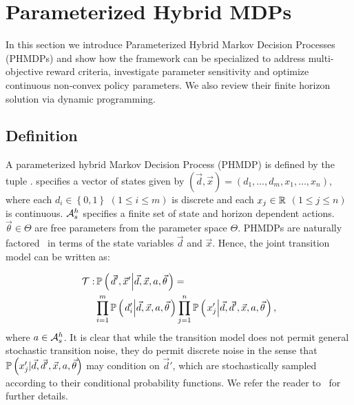 \section{Parameterized Hybrid MDPs}
\label{sec:hybrid_mdps}

In this section we introduce Parameterized Hybrid Markov Decision Processes (PHMDPs) and show how the framework can be specialized to address multi-objective reward criteria, investigate parameter sensitivity and optimize continuous non-convex policy parameters. We also review their finite horizon solution via dynamic programming.

\subsection{Definition}
\label{sec:phmdp_def}

A parameterized hybrid Markov Decision Process (PHMDP) is defined by the tuple {\footnotesize \PMDPTuple}. {\footnotesize \State} specifies a vector of states given by {\footnotesize $(\vec{d}, \vec{x}) =  \left( d_1, \ldots, d_m, x_1, \ldots, x_n \right) $}, where each {\footnotesize $ d_i \in \left\lbrace 0, 1 \right\rbrace $} {\footnotesize $\left( 1 \leq i \leq m \right)$} is discrete and each {\footnotesize$ x_j \in \mathbb{R} $} {\footnotesize $\left( 1 \leq j \leq   n \right)$} is continuous. {\footnotesize $\mathcal{A}^{h}_{s}$} specifies a finite set of state and horizon dependent actions.  {\footnotesize $\vec{\theta} \in \Theta$} are free parameters from the parameter space {\footnotesize $ \Theta $}. PHMDPs are naturally factored~\parencite{Boutilier_JAIR_1999} in terms of the state variables {\footnotesize$\vec{d}$} and {\footnotesize
$\vec{x}$}. Hence, the joint transition model can be written as:

{\footnotesize
\abovedisplayskip=0pt
\belowdisplayskip=0pt
\begin{align}
    \label{eq:hmdp_tfunc}
    \mathcal{T} :& \, \mathbb{P}\left({ \left. \vec{d}', \vec{x}' \middle| \vec{d}, \vec{x}, a, \vec{\theta} \right.}\right) = \nonumber \\
    & \prod_{i=1}^{m} \mathbb{P}\left({ \left. d_i' \middle| \vec{d}, \vec{x}, a, \vec{\theta} \right. }\right) \prod_{j=1}^{n} \mathbb{P}\left({ \left. x_j' \middle| \vec{d}, \vec{d}', \vec{x}, a, \vec{\theta} \right. }\right),
\end{align}   
}
where {\footnotesize $ a \in \mathcal{A}^{h}_{s} $}. It is clear that while the transition model does not permit general stochastic transition noise, they do permit discrete noise in the sense that {\footnotesize $ \mathbb{P}\left({ x_j' | \vec{d}, \vec{d}', \vec{x}, a, \vec{\theta} }\right) $} may condition on $ \vec{d}' $, which are stochastically sampled according to their conditional probability functions. We refer the reader to~\parencite{Zamani_AAAI_2012,Sanner_UAI_2011} for further details.


